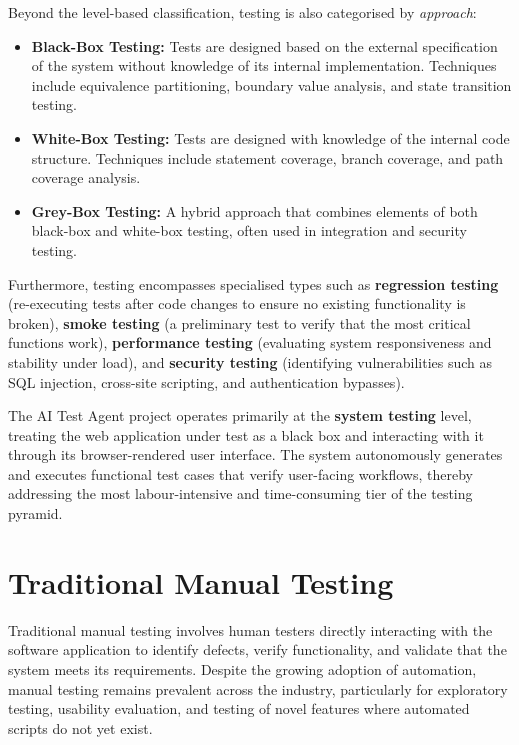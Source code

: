 Beyond the level-based classification, testing is also categorised by \emph{approach}:

\begin{itemize}
    \item \textbf{Black-Box Testing:} Tests are designed based on the external specification of the system without knowledge of its internal implementation. Techniques include equivalence partitioning, boundary value analysis, and state transition testing.
    \item \textbf{White-Box Testing:} Tests are designed with knowledge of the internal code structure. Techniques include statement coverage, branch coverage, and path coverage analysis.
    \item \textbf{Grey-Box Testing:} A hybrid approach that combines elements of both black-box and white-box testing, often used in integration and security testing.
\end{itemize}

Furthermore, testing encompasses specialised types such as \textbf{regression testing} (re-executing tests after code changes to ensure no existing functionality is broken), \textbf{smoke testing} (a preliminary test to verify that the most critical functions work), \textbf{performance testing} (evaluating system responsiveness and stability under load), and \textbf{security testing} (identifying vulnerabilities such as SQL injection, cross-site scripting, and authentication bypasses).

The AI Test Agent project operates primarily at the \textbf{system testing} level, treating the web application under test as a black box and interacting with it through its browser-rendered user interface. The system autonomously generates and executes functional test cases that verify user-facing workflows, thereby addressing the most labour-intensive and time-consuming tier of the testing pyramid.


\section{Traditional Manual Testing}
\label{sec:manual_testing}

Traditional manual testing involves human testers directly interacting with the software application to identify defects, verify functionality, and validate that the system meets its requirements. Despite the growing adoption of automation, manual testing remains prevalent across the industry, particularly for exploratory testing, usability evaluation, and testing of novel features where automated scripts do not yet exist.

